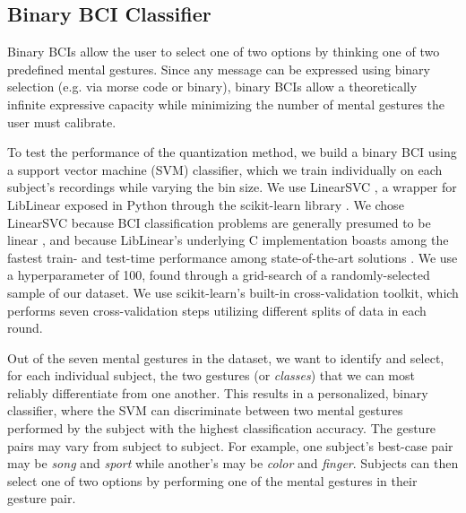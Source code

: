 \subsection{Binary BCI Classifier}

Binary BCIs allow the user to select one of two options by thinking one of two predefined mental gestures. Since any message can be expressed using binary selection (e.g. via morse code or binary), binary BCIs allow a theoretically infinite expressive capacity while minimizing the number of mental gestures the user must calibrate.

To test the performance of the quantization method, we build a binary BCI using a support vector machine (SVM) classifier, which we train individually on each subject's recordings while varying the bin size. We use LinearSVC \cite{fan_liblinear:_2008}, a wrapper for LibLinear exposed in Python through the scikit-learn library \cite{pedregosa_scikit-learn:_2011}. We chose LinearSVC because BCI classification problems are generally presumed to be linear  \cite{garrett_comparison_2003,lotte_review_2007}, and because LibLinear's underlying C implementation boasts among the fastest train- and test-time performance among state-of-the-art solutions \cite{fan_liblinear:_2008}. We use a hyperparameter of 100, found through a grid-search of a randomly-selected sample of our dataset. We use scikit-learn's built-in cross-validation toolkit, which performs seven cross-validation steps utilizing different splits of data in each round.

Out of the seven mental gestures in the dataset, we want to identify and select, for each individual subject, the two gestures (or \textit{classes}) that we can most reliably differentiate from one another. This results in a personalized, binary classifier, where the SVM can discriminate between two mental gestures performed by the subject with the highest classification accuracy. The gesture pairs may vary from subject to subject. For example, one subject's best-case pair may be \textit{song} and \textit{sport} while another's may be \textit{color} and \textit{finger}. Subjects can then select one of two options by performing one of the mental gestures in their gesture pair. 